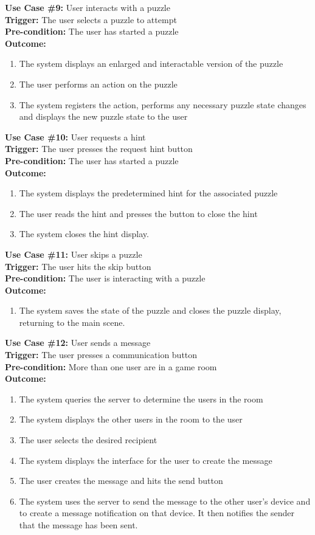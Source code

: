 \documentclass[12pt]{article}
\begin{document}
\textbf{Use Case \#9:} User interacts with a puzzle\\
\textbf{Trigger:} The user selects a puzzle to attempt\\
\textbf{Pre-condition:} The user has started a puzzle\\
\textbf{Outcome:}
\begin{enumerate} %
	\item The system displays an enlarged and interactable version of the puzzle
	\item The user performs an action on the puzzle
	\item The system registers the action, performs any necessary puzzle state changes and displays the new puzzle state to the user    
\end{enumerate}
\textbf{Use Case \#10:} User requests a hint\\
\textbf{Trigger:} The user presses the request hint button\\
\textbf{Pre-condition:} The user has started a puzzle\\
\textbf{Outcome:}
\begin{enumerate}
	\item The system displays the predetermined hint for the associated puzzle
	\item The user reads the hint and presses the button to close the hint
	\item The system closes the hint display.
\end{enumerate}
\textbf{Use Case \#11:} User skips a puzzle\\
\textbf{Trigger:} The user hits the skip button\\
\textbf{Pre-condition:} The user is interacting with a puzzle\\
\textbf{Outcome:}
\begin{enumerate}
	\item The system saves the state of the puzzle and closes the puzzle display, returning to the main scene.
\end{enumerate}
\textbf{Use Case \#12:} User sends a message\\
\textbf{Trigger:} The user presses a communication button\\
\textbf{Pre-condition:} More than one user are in a game room\\
\textbf{Outcome:}
\begin{enumerate}
	\item The system queries the server to determine the users in the room
	\item The system displays the other users in the room to the user
	\item The user selects the desired recipient
        \item The system displays the interface for the user to create the message
        \item The user creates the message and hits the send button
        \item The system uses the server to send the message to the other user's device and to create a message notification on that device. It then notifies the sender that the message has been sent.
\end{enumerate}
\end{document}
